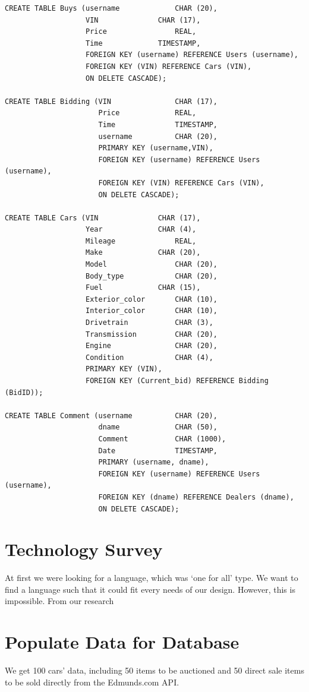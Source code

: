 \documentclass[12pt]{article}
\begin{document}
\begin{verbatim}
CREATE TABLE Buys (username				CHAR (20),
                   VIN				CHAR (17),
                   Price				REAL,
                   Time				TIMESTAMP,
                   FOREIGN KEY (username) REFERENCE Users (username),
                   FOREIGN KEY (VIN) REFERENCE Cars (VIN),
                   ON DELETE CASCADE);

CREATE TABLE Bidding (VIN				CHAR (17),
                      Price				REAL,
                      Time				TIMESTAMP,
                      username			CHAR (20),
                      PRIMARY KEY (username,VIN),
                      FOREIGN KEY (username) REFERENCE Users (username),
                      FOREIGN KEY (VIN) REFERENCE Cars (VIN),
                      ON DELETE CASCADE);
                      
CREATE TABLE Cars (VIN				CHAR (17),
                   Year				CHAR (4),
                   Mileage				REAL,
                   Make				CHAR (20),
                   Model				CHAR (20),
                   Body_type			CHAR (20),
                   Fuel				CHAR (15),
                   Exterior_color		CHAR (10),
                   Interior_color		CHAR (10),
                   Drivetrain			CHAR (3),
                   Transmission			CHAR (20),
                   Engine				CHAR (20),
                   Condition			CHAR (4),	
                   PRIMARY KEY (VIN),
                   FOREIGN KEY (Current_bid) REFERENCE Bidding (BidID));

CREATE TABLE Comment (username			CHAR (20),
                      dname				CHAR (50),
                      Comment			CHAR (1000),
                      Date				TIMESTAMP,
                      PRIMARY (username, dname),
                      FOREIGN KEY (username) REFERENCE Users (username),
                      FOREIGN KEY (dname) REFERENCE Dealers (dname),
                      ON DELETE CASCADE);
\end{verbatim}

\section{Technology Survey}
\par At first we were looking for a language, which was `one for all' type. We want to find a language such that it could fit every needs of our design. However, this is impossible. From our research 


\section{Populate Data for Database}
We get 100 cars' data, including 50 items to be auctioned and 50 direct sale items to be sold directly from the Edmunds.com API.
\end{document}
